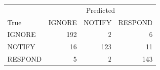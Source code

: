 \begin{tabular}{lrrr}
\toprule
 & \multicolumn{3}{c}{Predicted} \\
True & IGNORE & NOTIFY & RESPOND \\
\midrule
IGNORE & 192 & 2 & 6 \\
NOTIFY & 16 & 123 & 11 \\
RESPOND & 5 & 2 & 143 \\
\bottomrule
\end{tabular}
